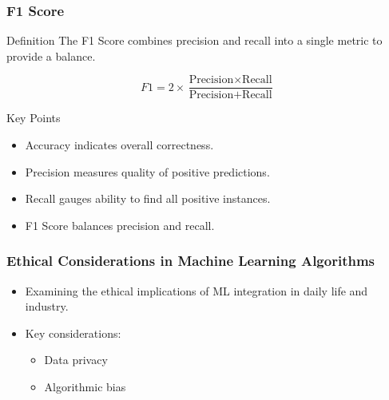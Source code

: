 \documentclass[aspectratio=169]{beamer}
\begin{document}
\begin{frame}[fragile]
    \frametitle{F1 Score}
    \begin{block}{Definition}
        The F1 Score combines precision and recall into a single metric to provide a balance.
    \end{block}

    \begin{equation}
        F1 = 2 \times \frac{\text{Precision} \times \text{Recall}}{\text{Precision} + \text{Recall}}
    \end{equation}


    \begin{block}{Key Points}
        \begin{itemize}
            \item Accuracy indicates overall correctness.
            \item Precision measures quality of positive predictions.
            \item Recall gauges ability to find all positive instances.
            \item F1 Score balances precision and recall.
        \end{itemize}
    \end{block}
\end{frame}

\begin{frame}[fragile]
    \frametitle{Ethical Considerations in Machine Learning Algorithms}
    \begin{itemize}
        \item Examining the ethical implications of ML integration in daily life and industry.
        \item Key considerations: 
        \begin{itemize}
            \item Data privacy
            \item Algorithmic bias
        \end{itemize}
    \end{itemize}
\end{frame}
\end{document}
